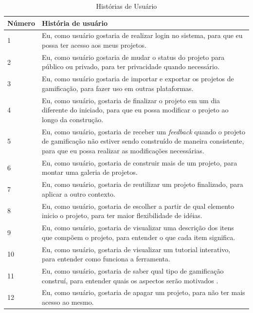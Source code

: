 \begin{table}[!htpb]
\centering
\begin{tabular}{|p{1.5cm}|p{12cm}|} \hline

 Número & História de usuário \\ \hline

 1 & Eu, como usuário gostaria de realizar login no sistema, para que eu possa ter acesso aos meus projetos. \\ \hline

 2 & Eu, como usuário gostaria de mudar o status do projeto para público ou privado,  para ter privacidade quando necessário. \\ \hline

 3 & Eu, como usuário gostaria de importar e exportar os projetos de gamificação, para fazer uso em outras plataformas. \\ \hline

 4 & Eu, como usuário, gostaria de finalizar o projeto em um dia diferente do iniciado, para que eu possa modificar o projeto ao longo da construção. \\ \hline

 5 & Eu, como usuário, gostaria de receber um \textit{feedback} quando o projeto de gamificação não estiver sendo construído de maneira consistente, para que eu possa realizar as modificações necessárias. \\ \hline

 6 & Eu, como usuário, gostaria de construir mais de um projeto, para montar uma galeria de projetos. \\ \hline

 7 & Eu, como usuário, gostaria de reutilizar um projeto finalizado, para aplicar a outro contexto. \\ \hline

 8 & Eu, como usuário, gostaria de escolher a partir de qual elemento inicio o projeto, para ter maior flexibilidade de idéias. \\ \hline

 9 & Eu, como usuário, gostaria de visualizar uma descrição dos itens que compõem o projeto, para entender o que cada item significa. \\ \hline

 10 & Eu, como usuário, gostaria de visualizar um tutorial interativo, para entender como funciona a ferramenta. \\ \hline

 11 & Eu, como usuário, gostaria de saber qual tipo de gamificação construí, para entender quais os aspectos serão motivados . \\ \hline

 12 & Eu, como usuário, gostaria de apagar um projeto, para não ter mais acesso ao mesmo. \\ \hline
\end{tabular}
\caption{Histórias de Usuário\label{tab01}
}
\end{table} 




